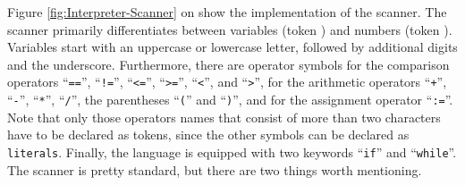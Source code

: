 Figure \ref{fig:Interpreter-Scanner} on \pageref{fig:Interpreter-Scanner} show the implementation of the
scanner. The scanner primarily differentiates between variables (token ) and numbers (token
).  Variables start with an uppercase or lowercase letter, followed by additional digits and 
the underscore. Furthermore, there are operator symbols for the comparison operators
``\texttt{==}'', ``\texttt{!=}'', ``\texttt{<=}'', ``\texttt{>=}'', ``\texttt{<}'', and ``\texttt{>}'',
for the arithmetic operators ``\texttt{+}'',  ``\texttt{-}'',  ``\texttt{*}'',  ``\texttt{/}'', the parentheses
``\texttt{(}'' and ``\texttt{)}'',  and for the assignment operator ``\texttt{:=}''.  Note that only those operators names 
that consist of more than two characters have to be declared as tokens, since the other symbols can be declared
as \texttt{literals}.  Finally, the language is equipped with two keywords ``\texttt{if}'' and ``\texttt{while}''.
The scanner is pretty standard, but there are two things worth mentioning.
